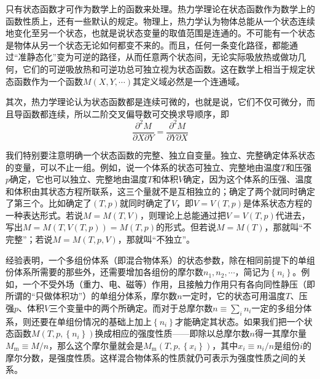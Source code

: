 \documentclass[main.tex]{subfiles}
\begin{document}
只有状态函数才可作为数学上的函数来处理。热力学理论在状态函数作为数学上的函数性质上，还有一些默认的规定。物理上，热力学认为物体总能从一个状态连续地变化至另一个状态，也就是说状态变量的取值范围是连通的。不可能有一个状态是物体从另一个状态无论如何都变不来的。而且，任何一条变化路径，都能通过“准静态化”变为可逆的路径，从而任意两个状态间，无论实际吸放热或做功几何，它们的可逆吸放热和可逆功总可独立视为状态函数。这在数学上相当于规定状态函数作为一个函数$M\left(X,Y,\cdots\right)$其定义域必然是一个连通域。

其次，热力学理论认为状态函数都是连续可微的，也就是说，它们不仅可微分，而且导函数都连续，所以二阶交叉偏导数可交换求导顺序，即
\[\frac{\partial^2 M}{\partial X\partial Y}=\frac{\partial ^2 M}{\partial Y\partial X}\]

我们特别要注意明确一个状态函数的完整、独立自变量。独立、完整确定体系状态的变量，可以不止一组。例如，说一个体系的状态可独立、完整地由温度$T$和压强$p$确定，它也可以独立、完整地由温度$T$和体积$V$确定，因为这个体系的压强、温度和体积由其状态方程所联系，这三个量就不是互相独立的；确定了两个就同时确定了第三个。比如确定了$\left(T,p\right)$就同时确定了$V$，即$V=V\left(T,p\right)$是体系状态方程的一种表达形式。若说$M=M\left(T,V\right)$，则理论上总能通过把$V=V\left(T,p\right)$代进去，写出$M=M\left(T,V\left(T,p\right)\right)=M\left(T,p\right)$的形式。但若说$M=M\left(T\right)$，那就叫“不完整”；若说$M=M\left(T,p,V\right)$，那就叫“不独立”。

经验表明，一个多组份体系（即混合物体系）的状态参数，除在相同前提下的单组份体系所需要的那些外，还需要增加各组份的摩尔数$n_1,n_2,\cdots$，简记为$\left\{n_i\right\}$。例如，一个不受外场（重力、电、磁等）作用，且接触力作用只有各向同性静压（即所谓的“只做体积功”）的单组分体系，摩尔数$n$一定时，它的状态可用温度$T$、压强$p$、体积$V$三个变量中的两个所确定。而对于总摩尔数$n\equiv\sum_in_i$一定的多组分体系，则还要在单组份情况的基础上加上$\left\{n_i\right\}$才能确定其状态。如果我们把一个状态函数$M\left(T,p,\left\{n_i\right\}\right)$换成相应的强度性质——即除以总摩尔数$n$得一其摩尔量$M_\text{m}\equiv M/n$，那么这个摩尔量就会是$M_\text{m}\left(T,p,\left\{x_i\right\}\right)$，其中$x_i\equiv n_i/n$是组份$i$的摩尔分数，是强度性质。这样混合物体系的性质就仍可表示为强度性质之间的关系。
\end{document}
